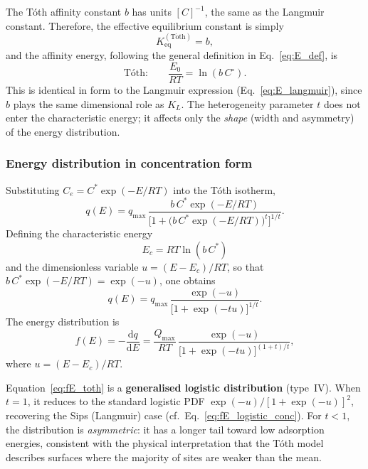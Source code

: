 	The T\'oth affinity constant $b$ has units $[C]^{-1}$, the same as the
	Langmuir constant. Therefore, the effective equilibrium constant is
	simply
	\begin{equation}
		K_{\mathrm{eq}}^{\mathrm{(T\acute{o}th)}} = b,
	\end{equation}
	and the affinity energy, following the general definition in
	Eq.~\eqref{eq:E_def}, is
	\begin{equation}
		\text{T\'oth:}\qquad
		\frac{E_0}{RT} = \ln(b\,C^\circ).
		\label{eq:E_toth}
	\end{equation}
	This is identical in form to the Langmuir expression
	(Eq.~\eqref{eq:E_langmuir}), since $b$ plays the same dimensional role
	as $K_L$. The heterogeneity parameter $t$ does not enter the
	characteristic energy; it affects only the \emph{shape} (width and
	asymmetry) of the energy distribution.

	\subsubsection{Energy distribution in concentration form}

	Substituting $C_e = C^{\ast}\exp(-E/RT)$ into the T\'oth isotherm,
	\begin{equation}
		q(E) = q_{\max}\,
		\frac{b\,C^{\ast}\exp(-E/RT)}
		{\bigl[1 + \bigl(b\,C^{\ast}\exp(-E/RT)\bigr)^{t}\bigr]^{1/t}}.
	\end{equation}
	Defining the characteristic energy
	\begin{equation}
		E_c = RT\ln(b\,C^{\ast})
	\end{equation}
	and the dimensionless variable $u = (E - E_c)/RT$, so that
	$b\,C^{\ast}\exp(-E/RT) = \exp(-u)$, one obtains
	\begin{equation}
		q(E) = q_{\max}\,
		\frac{\exp(-u)}
		{\bigl[1 + \exp(-tu)\bigr]^{1/t}}.
		\label{eq:qE_toth}
	\end{equation}
	The energy distribution is
	\begin{equation}
		f(E) = -\frac{\mathrm{d}q}{\mathrm{d}E}
		= \frac{Q_{\max}}{RT}\,
		\frac{\exp(-u)}
		{\bigl[1 + \exp(-tu)\bigr]^{(1+t)/t}},
		\label{eq:fE_toth}
	\end{equation}
	where $u = (E - E_c)/RT$.

	Equation~\eqref{eq:fE_toth} is a \textbf{generalised logistic
	distribution} (type~IV). When $t = 1$, it reduces to the standard
	logistic PDF $\exp(-u)/[1+\exp(-u)]^2$, recovering the Sips
	(Langmuir) case (cf.\ Eq.~\eqref{eq:fE_logistic_conc}). For $t < 1$,
	the distribution is \emph{asymmetric}: it has a longer tail toward low
	adsorption energies, consistent with the physical interpretation that
	the T\'oth model describes surfaces where the majority of sites are
	weaker than the mean.

